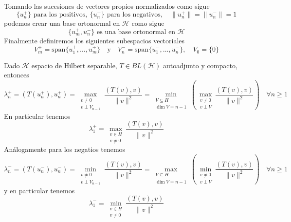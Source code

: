 \documentclass[12pt]{book}
\begin{document}
\noindent
Tomando las sucesiones de vectores propios normalizados como sigue
\begin{equation*}
    \{u_n^+\} \text{ para los positivos}, \ \{u_n^-\} \text{ para los negativos}, \quad \|u_n^+\| = \|u_n^-\| = 1
\end{equation*}
podemos crear una base ortonormal en $\mathcal{H}$ como sigue
\begin{equation*}
    \{u_m^+, u_n^-\} \text{ es una base ortonormal en } \mathcal{H}
\end{equation*}
Finalmente definiremos los siguientes subespacios vectoriales
\begin{equation*}
    V_m^+ = \text{span}\{u_1^+, \dots, u_m^+\} \quad \text{y} \quad V_n^- = \text{span}\{u_1^-, \dots, u_n^-\}, \quad V_0 = \{0\}
\end{equation*}
    
\begin{teo}
    Dado $\mathcal{H}$ espacio de Hilbert separable, $T \in BL(\mathcal{H})$ autoadjunto y compacto, entonces 
    \begin{equation*}
        \lambda_n^+ = ( T(u_n^+), u_n^+ ) = \max_{\substack{v \neq 0 \\ v \perp V_{n-1}}} \frac{( T(v), v )}{\|v\|^2} = \min_{\substack{V \subseteq H \\ \dim V = n-1}} \left( \max_{\substack{v \neq 0 \\ v \perp V}} \frac{( T(v), v )}{\|v\|^2} \right) \quad \forall n\geq 1
    \end{equation*}
    En particular tenemos
    \begin{equation*}
        \lambda_1^+ = \max_{\substack{v \in H \\ v \neq 0}} \frac{( T(v), v )}{\|v\|^2}
    \end{equation*}
    Análogamente para los negatios tenemos
    \begin{equation*}
        \lambda_n^- = ( T(u_n^-), u_n^- ) = \min_{\substack{v \neq 0 \\ v \perp V_{n-1}}} \frac{( T(v), v )}{\|v\|^2} = \max_{\substack{V \subseteq H \\ \dim V = n-1}} \left( \min_{\substack{v \neq 0 \\ v \perp V}} \frac{( T(v), v )}{\|v\|^2} \right) \quad \forall n\geq 1
    \end{equation*}
    y en particular tenemos
    \begin{equation*}
        \lambda_1^- = \min_{\substack{v \in H \\ v \neq 0}} \frac{( T(v), v )}{\|v\|^2}
    \end{equation*}
\end{teo}
\end{document}
